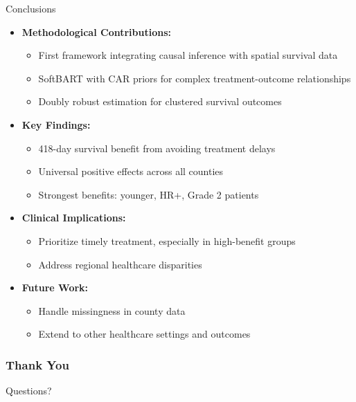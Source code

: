 \documentclass{beamer}
\begin{document}
    \begin{frame}{Conclusions}
        \begin{itemize}
          \vfill \item \textbf{Methodological Contributions:}
          \begin{itemize}
            \vfill \item First framework integrating causal inference with spatial survival data
            \vfill \item SoftBART with CAR priors for complex treatment-outcome relationships
            \vfill \item Doubly robust estimation for clustered survival outcomes
          \end{itemize}
          \vspace{6pt}
          \vfill \item \textbf{Key Findings:}
          \begin{itemize}
            \vfill \item 418-day survival benefit from avoiding treatment delays
            \vfill \item Universal positive effects across all counties
            \vfill \item Strongest benefits: younger, HR+, Grade 2 patients
          \end{itemize}
          \vspace{6pt}
          \vfill \item \textbf{Clinical Implications:}
          \begin{itemize}
            \vfill \item Prioritize timely treatment, especially in high-benefit groups
            \vfill \item Address regional healthcare disparities
          \end{itemize}
          \vspace{6pt}
          \vfill \item \textbf{Future Work:}
          \begin{itemize}
            \vfill \item Handle missingness in county data 
            \vfill \item Extend to other healthcare settings and outcomes
          \end{itemize}
        \end{itemize}
        \end{frame}
\begin{frame}
\frametitle{Thank You}
\begin{center}
Questions?
\end{center}
\end{frame}
\end{document}
